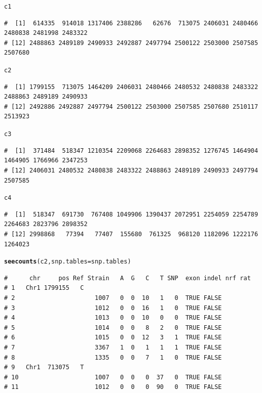 \documentclass{article}\usepackage[]{graphicx}\usepackage[]{color}
\makeatletter
\newcommand{\hlstd}[1]{\textcolor[rgb]{0.345,0.345,0.345}{#1}}%
\newcommand{\hlkwc}[1]{\textcolor[rgb]{0.333,0.667,0.333}{#1}}%
\newcommand{\hlkwd}[1]{\textcolor[rgb]{0.737,0.353,0.396}{\textbf{#1}}}%
\newenvironment{kframe}{%
 \def\at@end@of@kframe{}%
 \ifinner\ifhmode%
  \def\at@end@of@kframe{\end{minipage}}%
  \begin{minipage}{\columnwidth}%
 \fi\fi%
 \def\FrameCommand##1{\hskip\@totalleftmargin \hskip-\fboxsep
 \colorbox{shadecolor}{##1}\hskip-\fboxsep
     \hskip-\linewidth \hskip-\@totalleftmargin \hskip\columnwidth}%
 \MakeFramed {\advance\hsize-\width
   \@totalleftmargin\z@ \linewidth\hsize
   \@setminipage}}%
 {\par\unskip\endMakeFramed%
 \at@end@of@kframe}
\newenvironment{knitrout}{}{} %
\makeatother
\begin{document}
\begin{knitrout}
\begin{kframe}
\begin{alltt}
\hlstd{c1}
\end{alltt}
\begin{verbatim}
#  [1]  614335  914018 1317406 2388286   62676  713075 2406031 2480466 2480838 2481998 2483322
# [12] 2488863 2489189 2490933 2492887 2497794 2500122 2503000 2507585 2507680
\end{verbatim}
\begin{alltt}
\hlstd{c2}
\end{alltt}
\begin{verbatim}
#  [1] 1799155  713075 1464209 2406031 2480466 2480532 2480838 2483322 2488863 2489189 2490933
# [12] 2492886 2492887 2497794 2500122 2503000 2507585 2507680 2510117 2513923
\end{verbatim}
\begin{alltt}
\hlstd{c3}
\end{alltt}
\begin{verbatim}
#  [1]  371484  518347 1210354 2209068 2264683 2898352 1276745 1464904 1464905 1766966 2347253
# [12] 2406031 2480532 2480838 2483322 2488863 2489189 2490933 2497794 2507585
\end{verbatim}
\begin{alltt}
\hlstd{c4}
\end{alltt}
\begin{verbatim}
#  [1]  518347  691730  767408 1049906 1390437 2072951 2254059 2254789 2264683 2823796 2898352
# [12] 2998868   77394   77407  155680  761325  968120 1182096 1222176 1264023
\end{verbatim}
\begin{alltt}
\hlkwd{seecounts}\hlstd{(c2,}\hlkwc{snp.tables}\hlstd{=snp.tables)}
\end{alltt}
\begin{verbatim}
#      chr     pos Ref Strain   A  G   C   T SNP  exon indel nrf rat
# 1   Chr1 1799155   C                                              
# 2                      1007   0  0  10   1   0  TRUE FALSE        
# 3                      1012   0  0  16   1   0  TRUE FALSE        
# 4                      1013   0  0  10   0   0  TRUE FALSE        
# 5                      1014   0  0   8   2   0  TRUE FALSE        
# 6                      1015   0  0  12   3   1  TRUE FALSE        
# 7                      3367   1  0   1   1   1  TRUE FALSE        
# 8                      1335   0  0   7   1   0  TRUE FALSE        
# 9   Chr1  713075   T                                              
# 10                     1007   0  0   0  37   0  TRUE FALSE        
# 11                     1012   0  0   0  90   0  TRUE FALSE        

\end{verbatim}
\end{kframe}
\end{knitrout}
\end{document}
